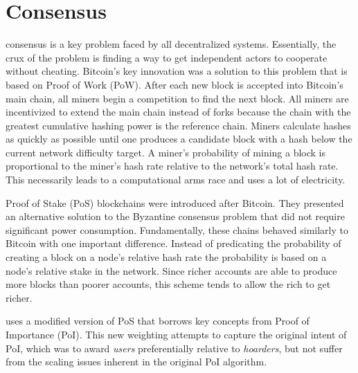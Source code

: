 \section{Consensus}
\label{sec:consensus}



\nemquote{
}{}

 consensus is a key problem faced by all decentralized systems.
Essentially, the crux of the problem is finding a way to get independent actors to cooperate without cheating.
Bitcoin's key innovation was a solution to this problem that is based on Proof of Work (PoW).
After each new block is accepted into Bitcoin's main chain, all miners begin a competition to find the next block.
All miners are incentivized to extend the main chain instead of forks because the chain with the greatest cumulative hashing power is the reference chain.
Miners calculate hashes as quickly as possible until one produces a candidate block with a hash below the current network difficulty target.
A miner's probability of mining a block is proportional to the miner's hash rate relative to the network's total hash rate.
This necessarily leads to a computational arms race and uses a lot of electricity.

Proof of Stake (PoS) blockchains were introduced after Bitcoin.
They presented an alternative solution to the Byzantine consensus problem that did not require significant power consumption.
Fundamentally, these chains behaved similarly to Bitcoin with one important difference.
Instead of predicating the probability of creating a block on a node's relative hash rate the probability is based on a node's relative stake in the network.
Since richer accounts are able to produce more blocks than poorer accounts, this scheme tends to allow the rich to get richer.

\codenamespace uses a modified version of PoS that borrows key concepts from Proof of Importance (PoI).
This new weighting attempts to capture the original intent of PoI, which was to award \emph{users} preferentially relative to \emph{hoarders}, but not suffer from the scaling issues inherent in the original PoI algorithm.

